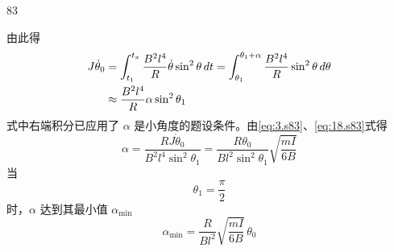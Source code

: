 \begin{solution}{83}
\begin{subsolution}
\begin{subsubsolution}
\begin{equation}
            \end{equation}
            由此得
            \begin{align}
                J \dot{\theta}_{0} &= \int_{t_{1}}^{t_{x}} \frac{B^{2} l^{4}}{R} \dot{\theta} \sin^{2} \theta \,dt = \int_{\theta_{1}}^{\theta_{1}+\alpha} \frac{B^{2} l^{4}}{R} \sin^{2} \theta \,d\theta \notag\\
                &\approx \frac{B^{2} l^{4}}{R} \alpha \sin^{2} \theta_{1}
                \label{eq:18.s83}
            \end{align}
            式中右端积分已应用了 $\alpha$ 是小角度的题设条件。由\eqref{eq:3.s83}、\eqref{eq:18.s83}式得
            \begin{equation}
                \alpha = \frac{R J \dot{\theta}_{0}}{B^{2} l^{4} \sin^{2} \theta_{1}} = \frac{R \theta_{0}}{B l^{2} \sin^{2} \theta_{1}} \sqrt{\frac{m I}{6 B}}
                \label{eq:19.s83}
            \end{equation}
            当
            \begin{equation}
                \theta_{1} = \frac{\pi}{2}
                \label{eq:20.s83}
            \end{equation}
            时，$\alpha$ 达到其最小值 $\alpha_{\min}$
            \begin{equation}
                \alpha_{\min} = \frac{R}{B l^{2}} \sqrt{\frac{m I}{6 B}} \, \theta_{0}
                \label{eq:21.s83}
            \end{equation}
        \end{subsubsolution}
    \end{subsolution}
\end{solution}